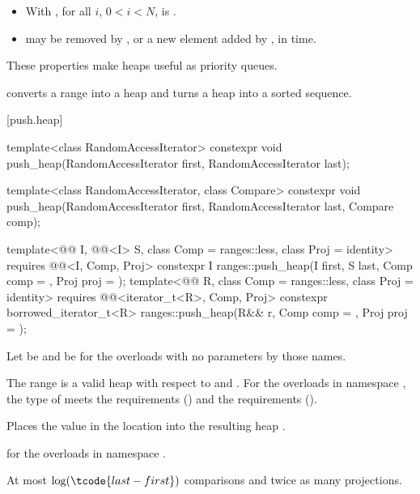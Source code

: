 \begin{itemize}
\item
  With , for all $i$, $0 < i < N$,
  is .
\item
   may be removed by , or
  a new element added by ,
  in  time.
\end{itemize}

\pnum
These properties make heaps useful as priority queues.

\pnum
{} converts a range into a heap and
 turns a heap into a sorted sequence.

[push.heap]{}

%
\begin{itemdecl}
template<class RandomAccessIterator>
  constexpr void push_heap(RandomAccessIterator first, RandomAccessIterator last);

template<class RandomAccessIterator, class Compare>
  constexpr void push_heap(RandomAccessIterator first, RandomAccessIterator last,
                           Compare comp);

template<@@ I, @@<I> S, class Comp = ranges::less,
         class Proj = identity>
  requires @@<I, Comp, Proj>
  constexpr I
    ranges::push_heap(I first, S last, Comp comp = {}, Proj proj = {});
template<@@ R, class Comp = ranges::less, class Proj = identity>
  requires @@<iterator_t<R>, Comp, Proj>
  constexpr borrowed_iterator_t<R>
    ranges::push_heap(R&& r, Comp comp = {}, Proj proj = {});
\end{itemdecl}

\begin{itemdescr}
\pnum
Let  be 
and  be 
for the overloads with no parameters by those names.

\pnum
\expects
The range 
is a valid heap with respect to  and .
For the overloads in namespace ,
the type of  meets
the  requirements () and
the  requirements ().

\pnum
\effects
Places the value in the location 
into the resulting heap .

\pnum
\returns
{} for the overloads in namespace .

\pnum
\complexity
At most $\log(\tcode{last - first})$ comparisons and twice as many projections.
\end{itemdescr}


